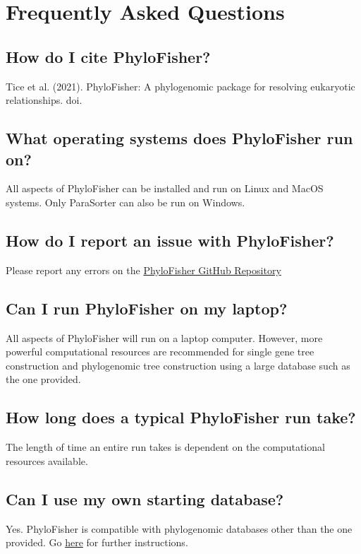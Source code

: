 \documentclass{article}
\begin{document}
\section{Frequently Asked Questions}
    \subsection{How do I cite PhyloFisher?}

        Tice et al. (2021). PhyloFisher: A phylogenomic package for resolving eukaryotic relationships. doi. 

    \subsection{What operating systems does PhyloFisher run on?}

        All aspects of PhyloFisher can be installed and run on Linux and MacOS systems. Only ParaSorter can also be run on Windows.
    
    \subsection{How do I report an issue with PhyloFisher?}
    
    Please report any errors on the \href{http://github.com/TheBrownLab/PhyloFisher}{PhyloFisher GitHub Repository}
    
    \subsection{Can I run PhyloFisher on my laptop?}
    All aspects of PhyloFisher will run on a laptop computer. However, more powerful computational resources are recommended for single gene tree construction and phylogenomic tree construction using a large database such as the one provided.
    
    \subsection{How long does a typical PhyloFisher run take?}
    The length of time an entire run takes is dependent on the computational resources available.
    
    \subsection{Can I use my own starting database?}
    Yes. PhyloFisher is compatible with phylogenomic databases other than the one provided. Go \hyperref[sec:customdb]{here} for further instructions.
    
\end{document}
